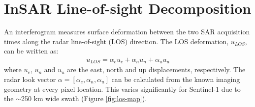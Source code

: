 %
%
%
%
%
%
%
%
%





\section{InSAR Line-of-sight Decomposition}
\label{sec:ch3-insar-decomp}
An interferogram measures surface deformation between the two SAR acquisition times along the radar line-of-sight (LOS) direction. The LOS deformation, $u_{LOS}$, can be written as: 
\begin{align}
	u_{LOS}= \alpha_{e} u_{e} + \alpha_{n} u_{n} + \alpha_{u} u_{u}
\end{align}
where $u_{e}$, $u_{n}$ and $u_{u}$ are the east, north and up displacements, respectively. The radar look vector $\alpha = [\alpha_e, \alpha_n, \alpha_u]$ can be calculated from the known imaging geometry at every pixel location. This varies significantly for Sentinel-1 due to the $ \sim$250 km wide swath (Figure \ref{fig:los-map}). 


